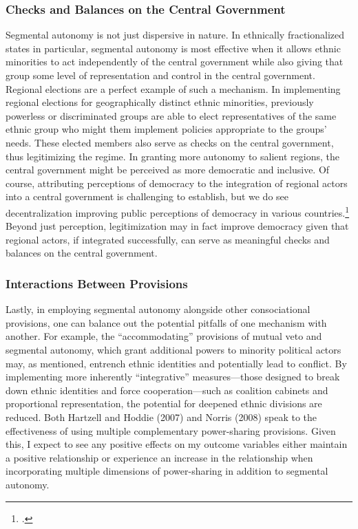 \documentclass[12pt]{article}
\begin{document}
\subsubsection{Checks and Balances on the Central Government}
Segmental autonomy is not just dispersive in nature. In ethnically fractionalized states in particular, segmental autonomy is most effective when it allows ethnic minorities to act independently of the central government while also giving that group some level of representation and control in the central government. Regional elections are a perfect example of such a mechanism. In implementing regional elections for geographically distinct ethnic minorities, previously powerless or discriminated groups are able to elect representatives of the same ethnic group who might them implement policies appropriate to the groups' needs. These elected members also serve as checks on the central government, thus legitimizing the regime. In granting more autonomy to salient regions, the central government might be perceived as more democratic and inclusive. Of course, attributing perceptions of democracy to the integration of regional actors into a central government is challenging to establish, but we do see decentralization improving public perceptions of democracy in various countries.\footcite{escobarlemmon_does_2014, world_values_survey_world_2007} Beyond just perception, legitimization may in fact improve democracy given that regional actors, if integrated successfully, can serve as meaningful checks and balances on the central government.

\subsubsection{Interactions Between Provisions}
Lastly, in employing segmental autonomy alongside other consociational provisions, one can balance out the potential pitfalls of one mechanism with another. For example, the ``accommodating'' provisions of mutual veto and segmental autonomy, which grant additional powers to minority political actors may, as mentioned, entrench ethnic identities and potentially lead to conflict. By implementing more inherently ``integrative'' measures---those designed to break down ethnic identities and force cooperation---such as coalition cabinets and proportional representation, the potential for deepened ethnic divisions are reduced. Both Hartzell and Hoddie (2007) and Norris (2008) speak to the effectiveness of using multiple complementary power-sharing provisions. Given this, I expect to see any positive effects on my outcome variables either maintain a positive relationship or experience an increase in the relationship when incorporating multiple dimensions of power-sharing in addition to segmental autonomy.
\end{document}
